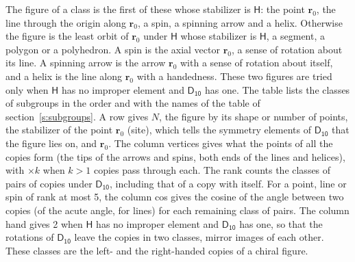 \documentclass[10pt,a4paper]{article}
\numberwithin{equation}{section}
\newcommand{\grp}[1]{\mathsf{#1}}
\newcommand{\pointr}{\mathbf{r}}
\begin{document}
\leavevmode\label{n:head.figure}The figure of a class is the first of these whose stabilizer is $\grp{H}$: the point $\pointr_0$, the line through the origin along $\pointr_0$, a spin, a spinning arrow and a helix. Otherwise the figure is the least orbit of $\pointr_0$ under $\grp{H}$ whose stabilizer is $\grp{H}$, a segment, a polygon or a polyhedron. A spin is the axial vector $\pointr_0$, a sense of rotation about its line. A spinning arrow is the arrow $\pointr_0$ with a sense of rotation about itself, and a helix is the line along $\pointr_0$ with a handedness. These two figures are tried only when $\grp{H}$ has no improper element and $\grp{D_{10}}$ has one. The table lists the classes of subgroups in the order and with the names of the table of section~\ref{s:subgroups}. \label{n:head.site}A row gives $N$, the figure by its shape or number of points, the stabilizer of the point $\pointr_0$ (site), which tells the symmetry elements of $\grp{D_{10}}$ that the figure lies on, and $\pointr_0$. \label{n:head.vertices}The column vertices gives what the points of all the copies form (the tips of the arrows and spins, both ends of the lines and helices), with ${\times}k$ when $k > 1$ copies pass through each. \label{n:head.rank}The rank counts the classes of pairs of copies under $\grp{D_{10}}$, including that of a copy with itself. \label{n:head.cos}For a point, line or spin of rank at most 5, the column cos gives the cosine of the angle between two copies (of the acute angle, for lines) for each remaining class of pairs. \label{n:head.hand}The column hand gives 2 when $\grp{H}$ has no improper element and $\grp{D_{10}}$ has one, so that the rotations of $\grp{D_{10}}$ leave the copies in two classes, mirror images of each other. These classes are the left- and the right-handed copies of a chiral figure.
\end{document}
